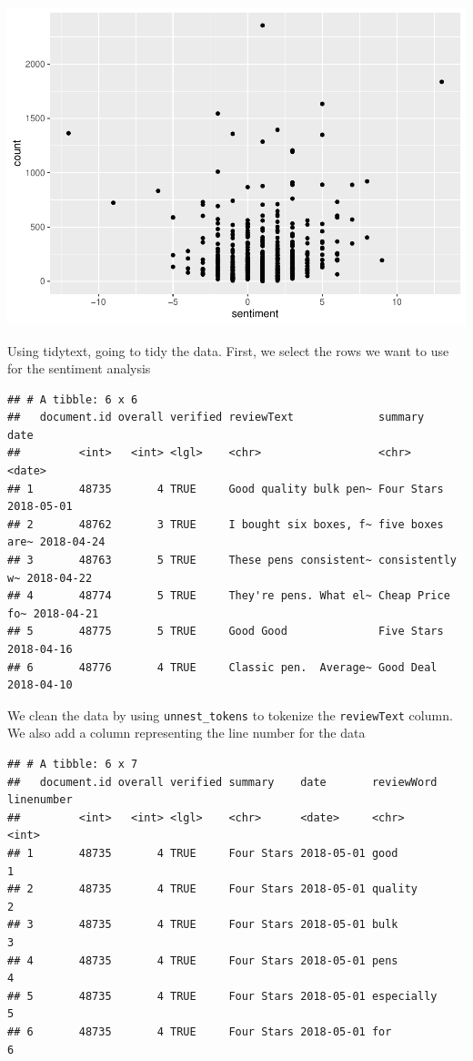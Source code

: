 \documentclass[
  11pt,
]{article}
\begin{document}
\includegraphics{Assignment-STAT702_files/figure-latex/unnamed-chunk-4-1.pdf}

Using tidytext, going to tidy the data. First, we select the rows we
want to use for the sentiment analysis

\begin{verbatim}
## # A tibble: 6 x 6
##   document.id overall verified reviewText             summary         date      
##         <int>   <int> <lgl>    <chr>                  <chr>           <date>    
## 1       48735       4 TRUE     Good quality bulk pen~ Four Stars      2018-05-01
## 2       48762       3 TRUE     I bought six boxes, f~ five boxes are~ 2018-04-24
## 3       48763       5 TRUE     These pens consistent~ consistently w~ 2018-04-22
## 4       48774       5 TRUE     They're pens. What el~ Cheap Price fo~ 2018-04-21
## 5       48775       5 TRUE     Good Good              Five Stars      2018-04-16
## 6       48776       4 TRUE     Classic pen.  Average~ Good Deal       2018-04-10
\end{verbatim}

We clean the data by using \texttt{unnest\_tokens} to tokenize the
\texttt{reviewText} column. We also add a column representing the line
number for the data

\begin{verbatim}
## # A tibble: 6 x 7
##   document.id overall verified summary    date       reviewWord linenumber
##         <int>   <int> <lgl>    <chr>      <date>     <chr>           <int>
## 1       48735       4 TRUE     Four Stars 2018-05-01 good                1
## 2       48735       4 TRUE     Four Stars 2018-05-01 quality             2
## 3       48735       4 TRUE     Four Stars 2018-05-01 bulk                3
## 4       48735       4 TRUE     Four Stars 2018-05-01 pens                4
## 5       48735       4 TRUE     Four Stars 2018-05-01 especially          5
## 6       48735       4 TRUE     Four Stars 2018-05-01 for                 6
\end{verbatim}
\end{document}
